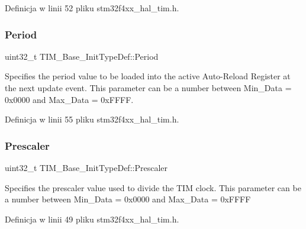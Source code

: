 Definicja w linii 52 pliku stm32f4xx\+\_\+hal\+\_\+tim.\+h.

\mbox{\label{struct_t_i_m___base___init_type_def_a8fab2bc184bb756763ff59c729b5be55}} 
\subsubsection{\texorpdfstring{Period}{Period}}
{\footnotesize\ttfamily uint32\+\_\+t T\+I\+M\+\_\+\+Base\+\_\+\+Init\+Type\+Def\+::\+Period}

Specifies the period value to be loaded into the active Auto-\/\+Reload Register at the next update event. This parameter can be a number between Min\+\_\+\+Data = 0x0000 and Max\+\_\+\+Data = 0x\+F\+F\+FF. 

Definicja w linii 55 pliku stm32f4xx\+\_\+hal\+\_\+tim.\+h.

\mbox{\label{struct_t_i_m___base___init_type_def_afc886119e6709bb576d25b5cf8d12d92}} 
\subsubsection{\texorpdfstring{Prescaler}{Prescaler}}
{\footnotesize\ttfamily uint32\+\_\+t T\+I\+M\+\_\+\+Base\+\_\+\+Init\+Type\+Def\+::\+Prescaler}

Specifies the prescaler value used to divide the T\+IM clock. This parameter can be a number between Min\+\_\+\+Data = 0x0000 and Max\+\_\+\+Data = 0x\+F\+F\+FF 

Definicja w linii 49 pliku stm32f4xx\+\_\+hal\+\_\+tim.\+h.

\mbox{\label{struct_t_i_m___base___init_type_def_aa949328175500fd1d112f64a4db5ae79}} 

